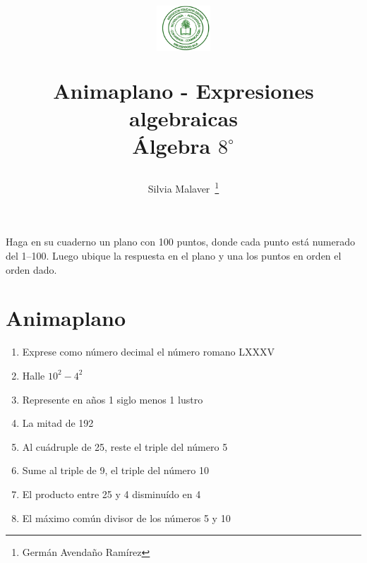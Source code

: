\documentclass[10pt,twoside]{article}
\author{Silvia Malaver~\thanks{Germán Avendaño Ramírez}}
\title{\begin{minipage}{0.15\textwidth}\includegraphics[height=1.7cm]{Images/logo-colegio.png}
\end{minipage}\hfill \begin{minipage}{0.85\textwidth}\begin{center}
Animaplano - Expresiones algebraicas\\Álgebra $8^{\circ}$\end{center}
\end{minipage}}
\date{}
\begin{document}
\maketitle
Haga en su cuaderno un plano con 100 puntos, donde cada punto está numerado del 1--100. Luego ubique la respuesta en el plano y una los puntos en orden el orden dado.
\section{Animaplano}
\begin{enumerate}
  \item Exprese como número decimal el número romano LXXXV
  \item Halle $ 10^2-4^2 $
  \item Represente en años 1 siglo menos 1 lustro
  \item La mitad de 192
  \item Al cuádruple de 25, reste el triple del número 5
  \item Sume al triple de 9, el triple del número 10
  \item El producto entre 25 y 4 disminuído en 4
  \item El máximo común divisor de los números 5 y 10
\end{enumerate}
\end{document}
